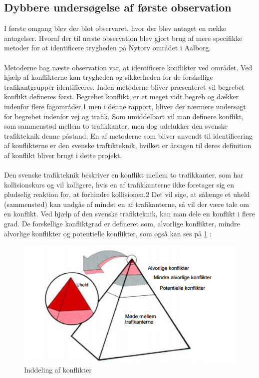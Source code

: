 \subsection{Dybbere undersøgelse af første observation}
\label{sub:dyb_undersoelse}
I første omgang blev der blot observaret, hvor der blev antaget en række antagelser. Hvoraf der til næste observation blev gjort brug af mere specifikke metoder for at identificere trygheden på Nytorv området i Aalborg.
\\\\
Metoderne bag næste observation var, at identificere konflikter ved området. Ved hjælp af konflikterne kan trygheden og sikkerheden for de forskellige trafikantgrupper identificeres. Inden metoderne bliver præsenteret vil begrebet konflikt defineres først. Begrebet konflikt, er et meget vidt begreb og dækker indenfor flere fagområder,1 men i denne rapport, bliver der nærmere undersøgt for begrebet indenfor vej og trafik. Som umiddelbart vil man definere konflikt, som sammenstød mellem to trafikkanter, men dog udelukker den svenske trafikteknik denne påstand.%
En af metoderne som bliver anvendt til identificering af konflikterne er den svenske traftikteknik, hvilket er årsagen til deres definition af konflikt bliver brugt i dette projekt.
\\\\
Den svenske trafikteknik beskriver en konflikt mellem to trafikkanter, som har kollisionskurs og vil kolligere, hvis en af trafikkanterne ikke foretager sig en pludselig reaktion for, at forhindre kollisionen.2 Det vil sige, at sålænge et uheld (sammenstød) kan undgås af mindst en af trafikanterne, så vil der være tale om en konflikt. Ved hjælp af den svenske trafikteknik, kan man dele en konflikt i flere grad. De forskellige konfliktgrad er defineret som, alvorlige konflikter, mindre alvorlige konflikter og potentielle konflikter, som også kan ses på \cref{fig:indellingkonflikter} :
 \begin{figure}[htbp]
   \label{fig:indellingkonflikter}
   \centering
   \begin{adjustbox}{max width=\textwidth}
     \includegraphics{billederogfigur/konflikt.png} %
  \end{adjustbox}
   \caption{Inddeling af konflikter}
 \end{figure}
\newpage

